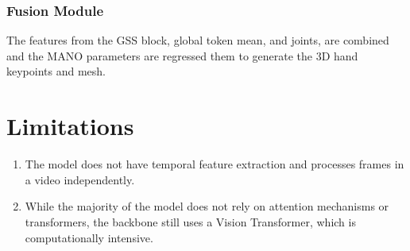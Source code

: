 \documentclass{article}
\begin{document}
\subsubsection*{Fusion Module}

The features from the GSS block, global token mean, and joints, are combined and the MANO parameters are regressed them to generate the 3D hand keypoints and mesh.

\section*{Limitations}

\begin{enumerate}
    \item The model does not have temporal feature extraction and processes frames in a video independently.
    \item While the majority of the model does not rely on attention mechanisms or transformers, the backbone still uses a Vision Transformer, which is computationally intensive.
\end{enumerate}
\end{document}
